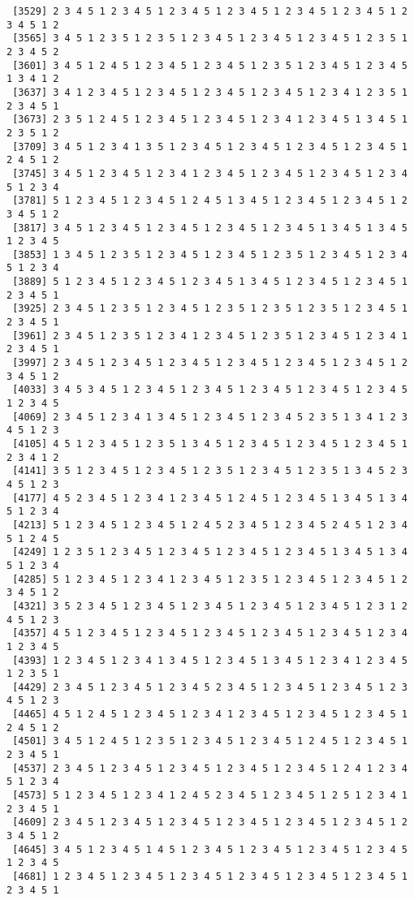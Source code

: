\documentclass[
  11pt,
]{book}
\begin{document}
\begin{verbatim}
 [3529] 2 3 4 5 1 2 3 4 5 1 2 3 4 5 1 2 3 4 5 1 2 3 4 5 1 2 3 4 5 1 2 3 4 5 1 2
 [3565] 3 4 5 1 2 3 5 1 2 3 5 1 2 3 4 5 1 2 3 4 5 1 2 3 4 5 1 2 3 5 1 2 3 4 5 2
 [3601] 3 4 5 1 2 4 5 1 2 3 4 5 1 2 3 4 5 1 2 3 5 1 2 3 4 5 1 2 3 4 5 1 3 4 1 2
 [3637] 3 4 1 2 3 4 5 1 2 3 4 5 1 2 3 4 5 1 2 3 4 5 1 2 3 4 1 2 3 5 1 2 3 4 5 1
 [3673] 2 3 5 1 2 4 5 1 2 3 4 5 1 2 3 4 5 1 2 3 4 1 2 3 4 5 1 3 4 5 1 2 3 5 1 2
 [3709] 3 4 5 1 2 3 4 1 3 5 1 2 3 4 5 1 2 3 4 5 1 2 3 4 5 1 2 3 4 5 1 2 4 5 1 2
 [3745] 3 4 5 1 2 3 4 5 1 2 3 4 1 2 3 4 5 1 2 3 4 5 1 2 3 4 5 1 2 3 4 5 1 2 3 4
 [3781] 5 1 2 3 4 5 1 2 3 4 5 1 2 4 5 1 3 4 5 1 2 3 4 5 1 2 3 4 5 1 2 3 4 5 1 2
 [3817] 3 4 5 1 2 3 4 5 1 2 3 4 5 1 2 3 4 5 1 2 3 4 5 1 3 4 5 1 3 4 5 1 2 3 4 5
 [3853] 1 3 4 5 1 2 3 5 1 2 3 4 5 1 2 3 4 5 1 2 3 5 1 2 3 4 5 1 2 3 4 5 1 2 3 4
 [3889] 5 1 2 3 4 5 1 2 3 4 5 1 2 3 4 5 1 3 4 5 1 2 3 4 5 1 2 3 4 5 1 2 3 4 5 1
 [3925] 2 3 4 5 1 2 3 5 1 2 3 4 5 1 2 3 5 1 2 3 5 1 2 3 5 1 2 3 4 5 1 2 3 4 5 1
 [3961] 2 3 4 5 1 2 3 5 1 2 3 4 1 2 3 4 5 1 2 3 5 1 2 3 4 5 1 2 3 4 1 2 3 4 5 1
 [3997] 2 3 4 5 1 2 3 4 5 1 2 3 4 5 1 2 3 4 5 1 2 3 4 5 1 2 3 4 5 1 2 3 4 5 1 2
 [4033] 3 4 5 3 4 5 1 2 3 4 5 1 2 3 4 5 1 2 3 4 5 1 2 3 4 5 1 2 3 4 5 1 2 3 4 5
 [4069] 2 3 4 5 1 2 3 4 1 3 4 5 1 2 3 4 5 1 2 3 4 5 2 3 5 1 3 4 1 2 3 4 5 1 2 3
 [4105] 4 5 1 2 3 4 5 1 2 3 5 1 3 4 5 1 2 3 4 5 1 2 3 4 5 1 2 3 4 5 1 2 3 4 1 2
 [4141] 3 5 1 2 3 4 5 1 2 3 4 5 1 2 3 5 1 2 3 4 5 1 2 3 5 1 3 4 5 2 3 4 5 1 2 3
 [4177] 4 5 2 3 4 5 1 2 3 4 1 2 3 4 5 1 2 4 5 1 2 3 4 5 1 3 4 5 1 3 4 5 1 2 3 4
 [4213] 5 1 2 3 4 5 1 2 3 4 5 1 2 4 5 2 3 4 5 1 2 3 4 5 2 4 5 1 2 3 4 5 1 2 4 5
 [4249] 1 2 3 5 1 2 3 4 5 1 2 3 4 5 1 2 3 4 5 1 2 3 4 5 1 3 4 5 1 3 4 5 1 2 3 4
 [4285] 5 1 2 3 4 5 1 2 3 4 1 2 3 4 5 1 2 3 5 1 2 3 4 5 1 2 3 4 5 1 2 3 4 5 1 2
 [4321] 3 5 2 3 4 5 1 2 3 4 5 1 2 3 4 5 1 2 3 4 5 1 2 3 4 5 1 2 3 1 2 4 5 1 2 3
 [4357] 4 5 1 2 3 4 5 1 2 3 4 5 1 2 3 4 5 1 2 3 4 5 1 2 3 4 5 1 2 3 4 1 2 3 4 5
 [4393] 1 2 3 4 5 1 2 3 4 1 3 4 5 1 2 3 4 5 1 3 4 5 1 2 3 4 1 2 3 4 5 1 2 3 5 1
 [4429] 2 3 4 5 1 2 3 4 5 1 2 3 4 5 2 3 4 5 1 2 3 4 5 1 2 3 4 5 1 2 3 4 5 1 2 3
 [4465] 4 5 1 2 4 5 1 2 3 4 5 1 2 3 4 1 2 3 4 5 1 2 3 4 5 1 2 3 4 5 1 2 4 5 1 2
 [4501] 3 4 5 1 2 4 5 1 2 3 5 1 2 3 4 5 1 2 3 4 5 1 2 4 5 1 2 3 4 5 1 2 3 4 5 1
 [4537] 2 3 4 5 1 2 3 4 5 1 2 3 4 5 1 2 3 4 5 1 2 3 4 5 1 2 4 1 2 3 4 5 1 2 3 4
 [4573] 5 1 2 3 4 5 1 2 3 4 1 2 4 5 2 3 4 5 1 2 3 4 5 1 2 5 1 2 3 4 1 2 3 4 5 1
 [4609] 2 3 4 5 1 2 3 4 5 1 2 3 4 5 1 2 3 4 5 1 2 3 4 5 1 2 3 4 5 1 2 3 4 5 1 2
 [4645] 3 4 5 1 2 3 4 5 1 4 5 1 2 3 4 5 1 2 3 4 5 1 2 3 4 5 1 2 3 4 5 1 2 3 4 5
 [4681] 1 2 3 4 5 1 2 3 4 5 1 2 3 4 5 1 2 3 4 5 1 2 3 4 5 1 2 3 4 5 1 2 3 4 5 1

\end{verbatim}
\end{document}
